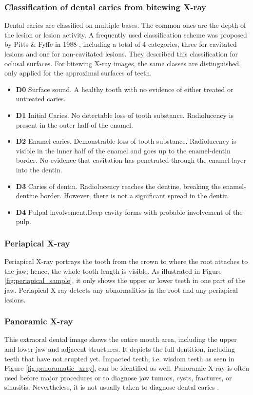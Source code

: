 \subsubsection{Classification of dental caries from bitewing X-ray}
\label{sec:caries_classification}
Dental caries are classified on multiple bases. The common ones are the depth of the lesion or lesion activity. \newline
A frequently used classification scheme was proposed by Pitts \& Fyffe in 1988 \cite{2019a}, including a total of 4 categories, three for cavitated lesions and one for non-cavitated lesions. They described this classification for oclusal surfaces. For bitewing X-ray images, the same classes are distinguished, only applied for the approximal surfaces of teeth.
\begin{itemize}
    \item \textbf{D0} Surface sound. A healthy tooth with no evidence of either treated or untreated caries.
    \item \textbf{D1} Initial Caries. No detectable loss of tooth substance. Radiolucency is present in the outer half of the enamel. 
    \item \textbf{D2} Enamel caries. Demonstrable loss of tooth substance. Radiolucency is visible in the inner half of the enamel and goes up to the enamel-dentin border. No evidence that cavitation has penetrated through the enamel layer into the dentin.
    \item \textbf{D3} Caries of dentin. Radiolucency reaches the dentine, breaking the enamel-dentine border. However, there is not a significant spread in the dentin.
    \item \textbf{D4} Pulpal involvement.Deep cavity forms with probable involvement of the pulp. 
\end{itemize}

\subsubsection{Periapical X-ray}
Periapical X-ray portrays the tooth from the crown to where the root attaches to the jaw; hence, the whole tooth length is visible. As illustrated in Figure \ref{fig:periapical_sample}, it only shows the upper or lower teeth in one part of the jaw.  Periapical X-ray detects any abnormalities in the root and any periapical lesions.

\subsubsection{Panoramic X-ray}
This extraoral dental image shows the entire mouth area, including the upper and lower jaw and adjacent structures. It depicts the full dentition, including teeth that have not erupted yet. Impacted teeth, i.e. wisdom teeth as seen in Figure \ref{fig:panoramatic_xray}, can be identified as well. Panoramic X-ray is often used before major procedures or to diagnose jaw tumors, cysts, fractures, or sinusitis. Nevertheless, it is not usually taken to diagnose dental caries \cite{clevland_xray}.

